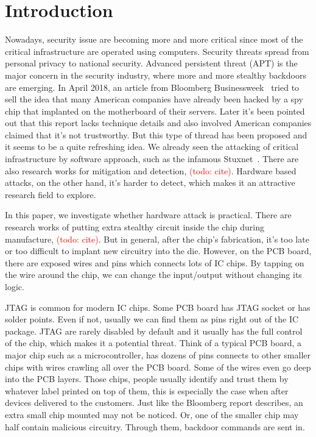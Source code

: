 \section{Introduction}
\label{sec:introduction}
Nowadays, security issue are becoming more and more critical since most of the critical infrastructure are operated using computers. Security threats spread from personal privacy to national security. Advanced persistent threat (APT) is the major concern in the security industry, where more and more stealthy backdoors are emerging. In April 2018, an article from Bloomberg Businessweek~\cite{robertson2018big} tried to sell the idea that many American companies have already been hacked by a spy chip that implanted on the motherboard of their servers. Later it's been pointed out that this report lacks technique details and also involved American companies claimed that it's not trustworthy. But this type of thread has been proposed and it seems to be a quite refreshing idea. We already seen the attacking of critical infrastructure by software approach, such as the infamous Stuxnet~\cite{langner2011stuxnet}. There are also research works for mitigation and detection, \textcolor{red}{(todo: cite)}. Hardware based attacks, on the other hand, it's harder to detect, which makes it an attractive research field to explore. 

In this paper, we investigate whether hardware attack is practical. There are research works of putting extra stealthy circuit inside the chip during manufacture, \textcolor{red}{(todo: cite)}. But in general, after the chip's fabrication, it's too late or too difficult to implant new circuitry into the die. However, on the PCB board, there are exposed wires and pins which connects lots of IC chips. By tapping on the wire around the chip, we can change the input/output without changing its logic.

JTAG is common for modern IC chips. Some PCB board has JTAG socket or has solder points. Even if not, usually we can find them as pins right out of the IC package. JTAG are rarely disabled by default and it usually has the full control of the chip, which makes it a potential threat. Think of a typical PCB board, a major chip such as a microcontroller, has dozens of pins connects to other smaller chips with wires crawling all over the PCB board. Some of the wires even go deep into the PCB layers. Those chips, people usually identify and trust them by whatever label printed on top of them, this is especially the case when after devices delivered to the customers. Just like the Bloomberg report describes, an extra small chip mounted may not be noticed. Or, one of the smaller chip may half contain malicious circuitry. Through them, backdoor commands are sent in.

